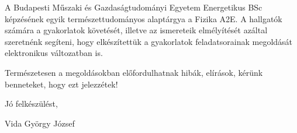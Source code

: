 
\vspace*{36pt}

 A Budapesti Műszaki és Gazdaságtudományi Egyetem Energetikus BSc képzésének egyik természettudományos alaptárgya a Fizika A2E. A hallgatók számára a gyakorlatok követését, illetve az ismereteik elmélyítését azáltal szeretnénk segíteni, hogy elkészítettük a gyakorlatok feladatsorainak megoldását elektronikus változatban is. 

 Természetesen a megoldásokban előfordulhatnak hibák, elírások, kérünk benneteket, hogy ezt jelezzétek!

 \vspace*{24pt} 
 
 \begin{flushright}
  Jó felkészülést,
  
  Vida György József
 \end{flushright}
